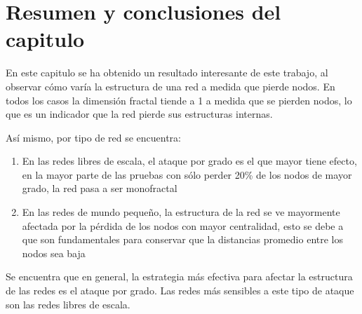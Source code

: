 
\section{Resumen y conclusiones del capitulo}

En este capitulo se ha obtenido un resultado interesante de este trabajo, al observar cómo varía la estructura de una red a medida que pierde nodos. En todos los casos la dimensión fractal tiende a 1 a medida que se pierden nodos, lo que es un indicador que la red pierde sus estructuras internas.

Así mismo, por tipo de red se encuentra:

\begin{enumerate}
    \item En las redes libres de escala, el ataque por grado es el que mayor tiene efecto, en la mayor parte de las pruebas con sólo perder 20\% de los nodos de mayor grado, la red pasa a ser monofractal
    \item En las redes de mundo pequeño, la estructura de la red se ve mayormente afectada por la pérdida de los nodos con mayor centralidad, esto se debe a que son fundamentales para conservar que la distancias promedio entre los nodos sea baja
\end{enumerate}

Se encuentra que en general, la estrategia más efectiva para afectar la estructura de las redes es el ataque por grado. Las redes más sensibles a este tipo de ataque son las redes libres de escala.

